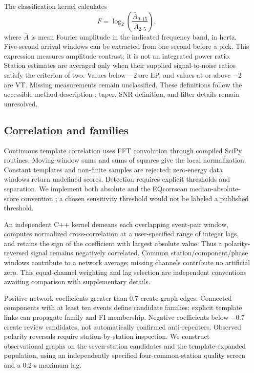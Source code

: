\documentclass[11pt]{article}
\begin{document}
The classification kernel calculates
\begin{equation}
 F=\log_2\left(\frac{\overline{A}_{9\text{--}15}}{\overline{A}_{2\text{--}5}}\right),
\end{equation}
where $\overline{A}$ is mean Fourier amplitude in the indicated frequency band, in hertz. Five-second arrival windows can be extracted from one second before a pick. This expression measures amplitude contrast; it is not an integrated power ratio. Station estimates are averaged only when their supplied signal-to-noise ratios satisfy the criterion of two. Values below $-2$ are LP, and values at or above $-2$ are VT. Missing measurements remain unclassified. These definitions follow the accessible method description \citep{song2026}; taper, SNR definition, and filter details remain unresolved.

\subsection{Correlation and families}
Continuous template correlation uses FFT convolution through compiled SciPy routines. Moving-window sums and sums of squares give the local normalization. Constant templates and non-finite samples are rejected; zero-energy data windows return undefined scores. Detection requires explicit thresholds and separation. We implement both absolute and the EQcorrscan median-absolute-score convention \citep{eqcorrscan}; a chosen sensitivity threshold would not be labeled a published threshold.

An independent C++ kernel demeans each overlapping event-pair window, computes normalized cross-correlation at a user-specified range of integer lags, and retains the sign of the coefficient with largest absolute value. Thus a polarity-reversed signal remains negatively correlated. Common station/component/phase windows contribute to a network average; missing channels contribute no artificial zero. This equal-channel weighting and lag selection are independent conventions awaiting comparison with supplementary details.

Positive network coefficients greater than 0.7 create graph edges. Connected components with at least ten events define candidate families; explicit template links can propagate family and FI membership. Negative coefficients below $-0.7$ create review candidates, not automatically confirmed anti-repeaters. Observed polarity reversals require station-by-station inspection. We construct observational graphs on the seven-station candidates and the template-expanded population, using an independently specified four-common-station quality screen and a 0.2-s maximum lag.
\end{document}
